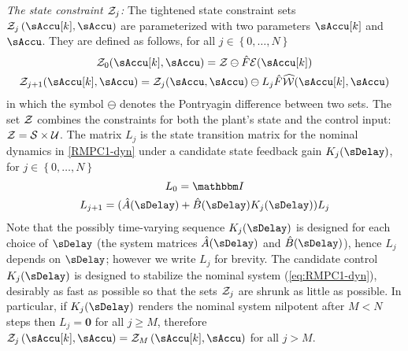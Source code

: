 \noindent\textit{The state constraint $\mathcal{Z}_{j}$:}
%
The tightened state constraint sets $\ZSet_{j}\left(\sAccu[k],\sAccu\right)$
are parameterized with two parameters $\sAccu[k]$ and $\sAccu$.
They are defined as follows, for all $j\in\left\{ 0,\dots,N\right\} $\begin{subequations}
\begin{gather}
\ZSet_{0}(\sAccu[k],\sAccu)=\ZSet\ominus\hat{F}\ESet(\sAccu[k])\label{eq:RMPC1-Z0}\\
\ZSet_{j+1}(\sAccu[k],\sAccu)=\ZSet_{j}(\sAccu,\sAccu)\ominus L_{j}\hat{F}\WhSet(\sAccu[k],\sAccu)\label{eq:RMPC1-Zj}
\end{gather}
\label{eq:RMPC1-Z}\end{subequations} in which the symbol $\ominus$
denotes the Pontryagin difference between two sets. The set $\mathcal{Z}$
combines the constraints for both the plant's state and the control
input: $\mathcal{Z}=\mathcal{S}\times\mathcal{U}$. The matrix $L_{j}$ is the state
transition matrix for the nominal dynamics in \eqref{RMPC1-dyn} under
a candidate state feedback gain $K_{j}(\sDelay)$, for $j\in\left\{ 0,\dots,N\right\}$
\begin{subequations}
\label{eq:RMPC1-L}
\begin{gather}
L_{0}=\IdentityMatrix\label{eq:RMPC1-L0}\\
L_{j+1}=(\hat{A}(\sDelay)+\hat{B}(\sDelay)K_{j}(\sDelay))L_{j}\label{eq:RMPC1-Lj}
\end{gather} 
\end{subequations}
Note that the possibly time-varying sequence $K_{j}(\sDelay)$ is designed for each choice of $\sDelay$ (\ie the system matrices $\hat{A}(\sDelay)$ and $\hat{B}(\sDelay)$), hence $L_{j}$ depends on $\sDelay$; however we write $L_{j}$ for brevity. The candidate control $K_{j}(\sDelay)$ is designed to stabilize the nominal system (\ref{eq:RMPC1-dyn}), desirably as fast as possible so that the sets $\mathcal{Z}_{j}$ are shrunk as little as possible. In particular, if $K_{j}(\sDelay)$ renders the nominal system nilpotent after $M<N$ steps then $L_{j}=\bm{0}$ for all $j\geq M$, therefore $\ZSet_{j}\left(\sAccu[k],\sAccu\right)=\ZSet_{M}\left(\sAccu[k],\sAccu\right)$ for all $j>M$.


